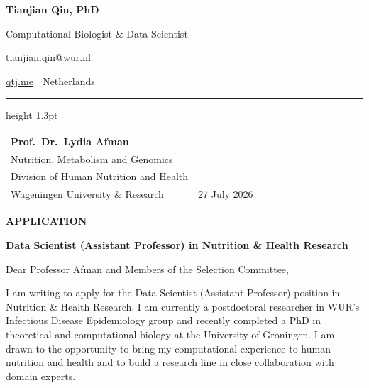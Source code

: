 \documentclass[10pt,a4paper]{article}
\begin{document}
\RaggedRight

\begin{minipage}[t]{0.56\textwidth}
  \vspace{0pt}
  {\fontsize{27}{29}\selectfont\bfseries\color{Navy} Tianjian Qin, PhD}\par
  \vspace{0.2em}
  {\large\color{Teal} Computational Biologist \& Data Scientist}\par
\end{minipage}
\hfill
\begin{minipage}[t]{0.40\textwidth}
  \vspace{0.1em}
  \raggedleft\small\color{Muted}
  \enspace
  \href{mailto:tianjian.qin@wur.nl}{tianjian.qin@wur.nl}\par
  \vspace{0.22em}
  \enspace\href{https://qtj.me}{qtj.me}
  \enspace\textcolor{Line}{|}\enspace
  \enspace Netherlands
\end{minipage}

\vspace{0.65em}
{\color{Teal}\hrule height 1.3pt}
\vspace{0.75em}

\begin{tabularx}{\textwidth}{@{}X>{\raggedleft\arraybackslash}p{4cm}@{}}
  \textbf{\color{Ink}Prof.\ Dr.\ Lydia Afman}\\
  Nutrition, Metabolism and Genomics\\
  Division of Human Nutrition and Health\\
  Wageningen University \& Research
  &
  \textcolor{Muted}{27 July 2026}
\end{tabularx}

\vspace{0.7em}
{\small\bfseries\color{Teal}APPLICATION}\par
\vspace{0.1em}
{\large\bfseries\color{Navy}Data Scientist (Assistant Professor) in Nutrition \& Health Research}

\vspace{0.75em}
Dear Professor Afman and Members of the Selection Committee,

I am writing to apply for the Data Scientist (Assistant Professor) position in Nutrition \& Health Research. I am currently a postdoctoral researcher in WUR's Infectious Disease Epidemiology group and recently completed a PhD in theoretical and computational biology at the University of Groningen. I am drawn to the opportunity to bring my computational experience to human nutrition and health and to build a research line in close collaboration with domain experts.
\end{document}
